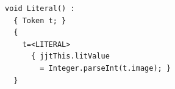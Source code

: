 \documentclass[dvipdfmx]{jarticle}
\begin{document}
\begin{minipage}{0.65\textwidth}
\begin{Verbatim}[frame=single]
  void Literal() :
  { Token t; }
  {
    t=<LITERAL>
      { jjtThis.litValue 
        = Integer.parseInt(t.image); }
  }  
\end{Verbatim}
\end{minipage}
\end{document}
